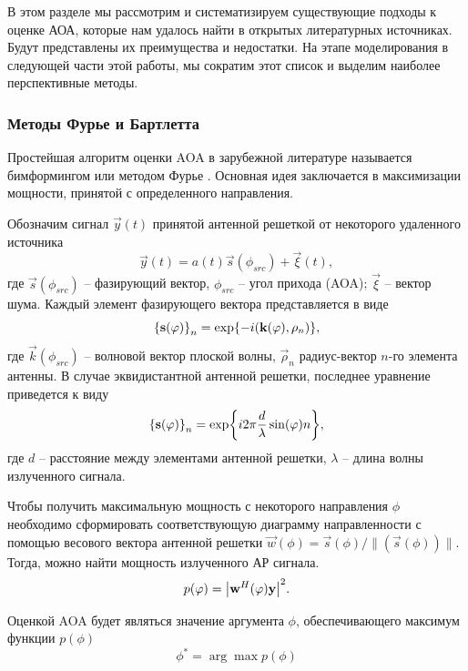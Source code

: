 В этом разделе мы рассмотрим и систематизируем существующие подходы к оценке
АОА, которые нам удалось найти в открытых литературных источниках.  Будут
представлены их преимущества и недостатки.  На этапе моделирования в следующей
части этой работы, мы сократим этот список и выделим наиболее перспективные
методы.

\subsubsection{Методы Фурье и Бартлетта}
\label{sec:3.2.1} \label{sec:Fourier}

Простейшая алгоритм оценки AOA в зарубежной литературе называется бимформингом \cite{Tuncer2009, Stoica2005} или методом Фурье \cite{Allen2006}.
Основная идея заключается в максимизации мощности, принятой с определенного
направления.

Обозначим сигнал $\vec{y}(t)$ принятой антенной решеткой от некоторого
удаленного источника
\begin{equation}
    \label{eq:3.1}
    \vec{y}(t) = a(t) \vec{s}(\phi_{src}) + \vec{\xi}(t),
\end{equation}
где ${\vec{s}(\phi_{src})}$ -- фазирующий вектор,
$\phi_{src}$ -- угол прихода (AOA); $\vec \xi$ -- вектор шума.
Каждый элемент фазирующего вектора представляется в виде
\begin{equation}
    \label{eq:3.2}
    \qty{\vec{s}(\phi)}_n = \exp{-i(\vec k (\phi), \vec \rho_n)},
\end{equation}
где $\vec k (\phi_{src})$ -- волновой вектор плоской волны, $\vec\rho_n$ радиус-вектор
$n$-го элемента антенны.
В случае эквидистантной антенной решетки, последнее уравнение приведется
к виду
\begin{equation}
    \qty{\vec s(\phi)}_n = \exp{i2\pi\frac{d}{\lambda}\sin(\phi)n},
\end{equation}
где $d$ -- расстояние между элементами антенной решетки, $\lambda$ -- длина
волны излученного сигнала.

Чтобы получить максимальную мощность с некоторого направления $\phi$ необходимо
сформировать соответствующую диаграмму направленности с помощью
весового вектора антенной решетки $\vec w (\phi) = \vec s(\phi)/\rVert(\vec
    s(\phi))\lVert$.  Тогда, можно найти мощность излученного АР сигнала.
\begin{equation}
    p(\phi) = \abs{\vec w^H (\phi) \vec y}^2.
\end{equation}

Оценкой AOA будет являться значение аргумента $\phi$, обеспечивающего максимум функции $p(\phi)$
\begin{equation}
    \phi^* = \arg\max p(\phi)
\end{equation}

